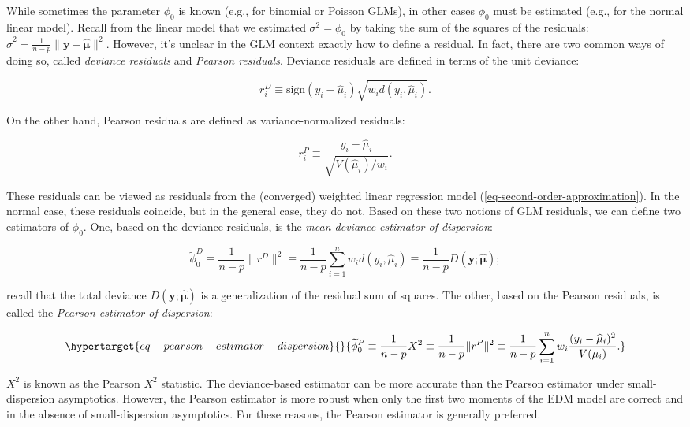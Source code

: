 \documentclass[
  11pt,
  letterpaper,
  oneside]{book}
\theoremstyle{plain}
\theoremstyle{plain}
\theoremstyle{definition}
\theoremstyle{definition}
\theoremstyle{plain}
\theoremstyle{remark}
\begin{document}
While sometimes the parameter \(\phi_0\) is known (e.g., for binomial or
Poisson GLMs), in other cases \(\phi_0\) must be estimated (e.g., for
the normal linear model). Recall from the linear model that we estimated
\(\sigma^2 = \phi_0\) by taking the sum of the squares of the residuals:
\(\widehat \sigma^2 = \frac{1}{n-p}\|\boldsymbol{y} - \boldsymbol{\widehat \mu}\|^2\).
However, it's unclear in the GLM context exactly how to define a
residual. In fact, there are two common ways of doing so, called
\emph{deviance residuals} and \emph{Pearson residuals}. Deviance
residuals are defined in terms of the unit deviance:

\[
  r^D_i \equiv \text{sign}(y_i - \widehat \mu_i)\sqrt{w_i d(y_i, \widehat \mu_i)}.
\]

On the other hand, Pearson residuals are defined as variance-normalized
residuals:

\[
  r^P_i \equiv \frac{y_i - \widehat \mu_i}{\sqrt{V(\widehat \mu_i)/w_i}}.
\]

These residuals can be viewed as residuals from the (converged) weighted
linear regression model (\ref{eq-second-order-approximation}). In the
normal case, these residuals coincide, but in the general case, they do
not. Based on these two notions of GLM residuals, we can define two
estimators of \(\phi_0\). One, based on the deviance residuals, is the
\emph{mean deviance estimator of dispersion}:

\[
\widetilde \phi^D_0 \equiv \frac{1}{n-p}\|r^D\|^2 \equiv \frac{1}{n-p}\sum_{i = 1}^n w_i d(y_i, \widehat \mu_i) \equiv \frac{1}{n-p}D(\boldsymbol{y}; \boldsymbol{\widehat \mu});
\]

recall that the total deviance
\(D(\boldsymbol{y}; \boldsymbol{\widehat \mu})\) is a generalization of
the residual sum of squares. The other, based on the Pearson residuals,
is called the \emph{Pearson estimator of dispersion}:

\begin{equation}\protect\hypertarget{eq-pearson-estimator-dispersion}{}{
\widetilde \phi^P_0 \equiv \frac{1}{n-p}X^2 \equiv \frac{1}{n-p}\|r^P\|^2 \equiv \frac{1}{n-p}\sum_{i = 1}^n w_i \frac{(y_i - \widehat \mu_i)^2}{V(\mu_i)}.
}\label{eq-pearson-estimator-dispersion}\end{equation}

\(X^2\) is known as the Pearson \(X^2\) statistic. The deviance-based
estimator can be more accurate than the Pearson estimator under
small-dispersion asymptotics. However, the Pearson estimator is more
robust when only the first two moments of the EDM model are correct and
in the absence of small-dispersion asymptotics. For these reasons, the
Pearson estimator is generally preferred.
\end{document}
